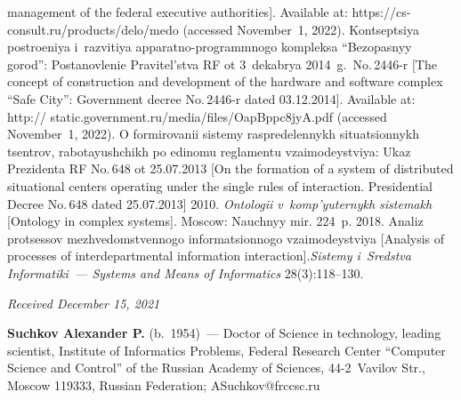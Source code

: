 \begin{multicols}{2}
{{\begin{thebibliography}{99}
management of the federal executive authorities]. Available at: {\sf 
https://cs-consult.ru/products/delo/medo} (accessed November~1, 2022).
Kon\-tsep\-tsiya po\-stro\-eniya i~raz\-vi\-tiya ap\-parat\-no-\mbox{pro\-gram\-mno\-go} komp\-lek\-sa 
``Bezopas\-nyy go\-rod'': Pos\-ta\-nov\-le\-nie Pra\-vi\-tel'\-s\-tva RF ot 3~dekabrya 2014~g.\ No.\,2446-r 
[The concept of construction and development of the hardware and software 
complex ``Safe City'': Government decree No.\,2446-r dated 03.12.2014]. 
Available at: {\sf http:// static.government.ru/media/files/OapBppc8jyA.pdf} 
(accessed November~1, 2022).
O for\-mi\-ro\-va\-nii sis\-te\-my ras\-pre\-de\-len\-nykh si\-tu\-a\-tsi\-on\-nykh tsent\-rov, ra\-bo\-ta\-yushchikh 
po edi\-no\-mu reg\-la\-men\-tu vza\-i\-mo\-deyst\-viya: Ukaz Pre\-zi\-den\-ta RF No.\,648  ot 25.07.2013
[On the formation of a system of distributed situational centers operating under the 
single rules of interaction. Presidential Decree No.\,648 dated 25.07.2013]
 2010. \textit{On\-to\-lo\-gii v~komp'\-yuter\-nykh sis\-te\-makh} 
[Ontology in complex systems]. Moscow: Nauchnyy mir. 224~p.
 2018. Ana\-liz pro\-tses\-sov mezh\-ve\-domst\-ven\-no\-go 
in\-for\-ma\-tsi\-on\-no\-go vza\-i\-mo\-deyst\-viya [Analysis of processes of interdepartmental 
information interaction].\linebreak \textit{Sistemy i~Sredstva Informatiki~--- Systems and 
Means of Informatics} 28(3):118--130.

\end{thebibliography}

 }
 }

\end{multicols}

\vspace*{-9pt}

\hfill{\small\textit{Received December 15, 2021}}

\vspace*{-16pt}

\Contrl

\vspace*{-3pt}

\noindent
\textbf{Suchkov Alexander P.} (b.\ 1954)~--- Doctor of Science in technology, 
leading scientist, Institute of Informatics Problems, Federal Research Center 
``Computer Science and Control'' of the Russian Academy of Sciences,  
44-2~Vavilov Str., Moscow 119333, Russian Federation;
\mbox{ASuchkov@frccsc.ru}

\label{end\stat}

\renewcommand{\bibname}{\protect\rm Литература}    